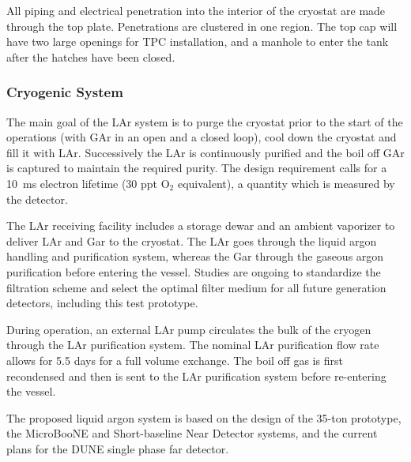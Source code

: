 All piping and electrical penetration into the interior of the cryostat are made through the top plate.
Penetrations are clustered in one region.
The top cap will have two large openings for TPC installation, and a manhole to enter the tank  after the
hatches have been closed.

\subsubsection{Cryogenic System}

The main goal of the LAr system is to purge the cryostat prior to the start of the operations (with GAr in an open
and a closed loop), cool down the cryostat and fill it with LAr. Successively the LAr is continuously purified
and the boil off GAr is captured  to maintain the required purity. The design requirement calls for a 10~ms electron lifetime (30 ppt O$_2$ equivalent), a quantity  which is measured by the detector.

The LAr receiving facility includes a storage dewar and an ambient vaporizer to deliver LAr and Gar to the
cryostat. The LAr goes through the liquid argon handling and purification system, whereas the Gar
through the gaseous argon purification before entering the vessel.
Studies are ongoing to standardize the filtration scheme and select the optimal filter medium for all
future generation detectors, including this test prototype.

During operation, an external LAr pump circulates the bulk of the cryogen through the LAr purification
system. The nominal LAr purification flow rate allows for 5.5 days for a full volume exchange.
The boil off gas is first recondensed and then is sent to the LAr purification system before
re-entering the vessel.

The proposed liquid argon system is based on the design of the 35-ton prototype, the MicroBooNE and Short-baseline Near Detector systems, and the current plans for the DUNE single phase far detector.










